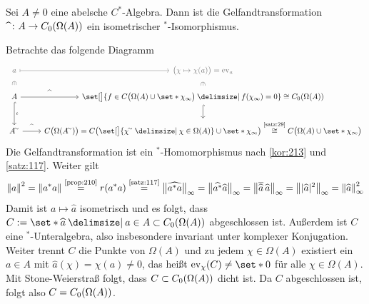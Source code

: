 \begin{satz}[name={Gelfand},label=satz16:gelfand]
	Sei $A \neq 0$ eine abelsche $C^*$-Algebra. 
	Dann ist die Gelfandtransformation $\widehat{\hspace{5pt}} \colon A \to C_0 \enbrace*{\Omega(A)}$ ein isometrischer ${}^*$-Isomorphismus.
\end{satz}
\begin{beweis}
	Betrachte das folgende Diagramm
	\[
		\begin{tikzcd}
			\color{dark_gray} a \rar[mapsto,dark_gray] \dar[phantom,"\in",sloped,dark_gray] & \color{dark_gray} \enbrace[\big]{\chi \mapsto \chi(a)}=\ev_a \dar[phantom,"\in",sloped,dark_gray] \\[-3pt]
			A \dar[hook,"\iota"] \rar["\widehat{\hspace{1ex}}"] 
			& \set[\big]{f \in C \enbrace[\big]{\Omega(A) \cup\set*{\chi_\infty}}\given f(\chi_\infty)=0} \cong C_0\enbrace*{\Omega(A)} \dar[hook] \\
			A^\simm \rar["\widehat{\hspace{1ex}}"] & C \enbrace[\big]{\Omega(A^\simm)} = C \enbrace[\big]{ \set[\big]{\chi^\simm \given \chi \in \Omega(A)} \cup \set*{\chi_\infty}} 
			\StackText{\ref{satz:29}}{\cong} C \enbrace[\big]{\Omega(A) \cup \set*{\chi_\infty}} 
		\end{tikzcd}
	\]
	Die Gelfandtransformation ist ein ${}^*$-Homomorphismus nach \autoref{kor:213} und \autoref{satz:117}. Weiter gilt 
	\[
		\norm*{a}^2 = \norm*{a^*a} \StackText{\ref{prop:210}}{=} r(a^*a) \StackText{\ref{satz:117}}{=} \norm[\big]{\widehat{a^*a}}_\infty = \norm*{\widehat{a^*} \widehat{a}}_\infty
		= \norm[\big]{\overline{\widehat{a}} \,\widehat{a}}_\infty = \norm[\big]{\abs{\widehat{a}}^2 }_\infty = \norm*{\widehat{a}}^2_\infty
	\]
	Damit ist $a \mapsto \widehat{a}$ isometrisch und es folgt, dass $C := \set*{\widehat{a} \given a \in A} \subset C_0 \enbrace*{\Omega(A)}$ abgeschlossen ist. 
	Außerdem ist $C$ eine ${}^*$-Unteralgebra, also insbesondere invariant unter komplexer Konjugation. 
	Weiter trennt $C$ die Punkte von $\Omega(A)$ und zu jedem $\chi \in \Omega(A)$ existiert ein $a \in A$ mit $\widehat{a}(\chi)= \chi(a) \neq 0$, das heißt $\ev_\chi(C) \neq \set*{0}$ für alle $\chi \in \Omega(A)$. 
	Mit Stone-Weierstraß folgt, dass $C \subset C_0 \enbrace*{\Omega(A)}$ dicht ist. 
	Da $C$ abgeschlossen ist, folgt also $C=C_0 \enbrace*{\Omega(A)}$.
\end{beweis}

